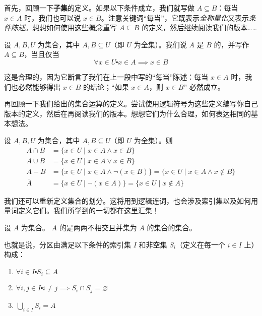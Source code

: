 首先，回顾一下\textbf{子集}的定义。如果以下条件成立，我们就写做 $A \subseteq B$：每当 $x \in A$ 时，我们也可以说 $x \in B$。注意关键词``每当''，它既表示\emph{全称量化}又表示\emph{条件陈述}。想想如何使用这些概念重写 $A \subseteq B$ 的定义，然后继续阅读我们的版本……

\begin{definition}
    设 $A, B, U$ 为集合，其中 $A, B \subseteq U$（即 $U$ 为全集）。我们说 $A$ 是 $B$ 的，并写作 $A \subseteq B$，当且仅当
    \[\forall x \in U \centerdot x \in A \implies x \in B \]
\end{definition}

这是合理的，因为它断言了我们在上一段中写的``每当''陈述：每当 $x \in A$ 时，我们也必然能够得出 $x \in B$ 的结论；``如果 $x \in A$，则 $x \in B$'' 必然成立。

再回顾一下我们给出的集合运算的定义。尝试使用逻辑符号为这些定义编写你自己版本的定义，然后在再阅读我们的版本。想想它们为什么合理，如何表达相同的基本想法。

\begin{definition}
    设 $A, B, U$ 为集合，其中 $A, B \subseteq U$（即 $U$ 为全集）。则
    \begin{align*}
        A \cap B &= \{x \in U \mid x \in A \land x \in B\} \\
        A \cup B &= \{x \in U \mid x \in A \lor x \in B\} \\
        A - B &= \{x \in U \mid x \in A \land \neg (x \in B)\} = \{x\in U \mid x \in A \land x \notin B\} \\
        \overline{A} &= \{x \in U \mid \neg (x \in A)\} = \{x \in U \mid x \notin A\}
    \end{align*}
\end{definition}

我们还可以重新定义集合的划分。这将用到逻辑连词，也会涉及索引集以及如何用量词定义它们。我们所学到的一切都在这里汇集！

\begin{definition} \label{def:definition4.5.11}
    设 $A$ 为集合。 $A$ 的是两两不相交且并集为 $A$ 的集合的集合。

    也就是说，分区由满足以下条件的索引集 $I$ 和非空集 $S_i$（定义在每一个 $i \in I$ 上）构成：
    \begin{enumerate}[label=(\arabic*)]
        \item $\forall i \in I \centerdot S_i \subseteq A$
        \item $\forall i, j \in I \centerdot i \ne j \implies S_i \cap S_j = \varnothing$
        \item $\displaystyle{\bigcup_{i \in I} S_i = A}$
    \end{enumerate}
\end{definition}

